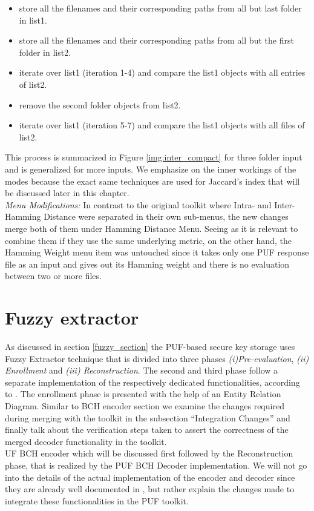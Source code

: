 \begin{itemize}
	\item store all the filenames and their corresponding paths from all but last folder in list1.
	\item store all the filenames and their corresponding paths from all but the first folder in list2.
	\item iterate over list1 (iteration 1-4) and compare the list1 objects with all entries of list2.
	\item remove the second folder objects from list2.
	\item iterate over list1 (iteration 5-7) and compare the list1 objects with all files of list2.
\end{itemize}

This process is summarized in Figure \ref{img:inter_compact} for three folder input and is generalized for more inputs. We emphasize on the inner workings of the modes because the exact same techniques are used for Jaccard's index that will be discussed later in this chapter.\\

\emph{Menu Modifications:} In contrast to the original toolkit where Intra- and Inter-Hamming Distance were separated in their own sub-menus, the new changes merge both of them under Hamming Distance Menu. Seeing as it is relevant to combine them if they use the same underlying metric, on the other hand, the Hamming Weight menu item was untouched since it takes only one PUF response file as an input and gives out its Hamming weight and there is no evaluation between two or
more files.\\


\section{Fuzzy extractor}
As discussed in section \ref{fuzzy_section} the PUF-based secure key storage uses Fuzzy Extractor technique that is divided into three phases \emph{(i)Pre-evaluation}, \emph{(ii) Enrollment} and \emph{(iii) Reconstruction}. The second and third phase follow a separate implementation of the respectively dedicated functionalities, according to \cite{10}. The enrollment phase is presented with the help of an Entity Relation Diagram. Similar to BCH encoder
section we examine the changes required during merging with the toolkit in the subsection ``Integration Changes'' and finally talk about the verification steps taken to assert the correctness of the merged decoder functionality in the toolkit.\\UF BCH encoder which will be discussed first followed by the Reconstruction phase, that is
realized by the PUF BCH Decoder implementation. We will not go into the details of the actual implementation of the encoder and decoder since they are already well documented in \cite{71}, but rather explain the changes made to integrate these functionalities in the PUF toolkit.\\


